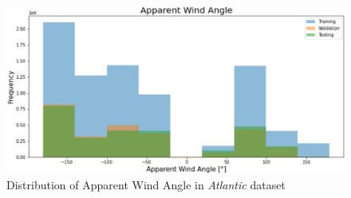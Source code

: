 \begin{figure}[h]
\centering
\includegraphics[width = \hsize]{figures/distributions/atlantic-AWA.png}
\caption{Distribution of Apparent Wind Angle in \textit{Atlantic} dataset \cite{charles}}
\end{figure}

